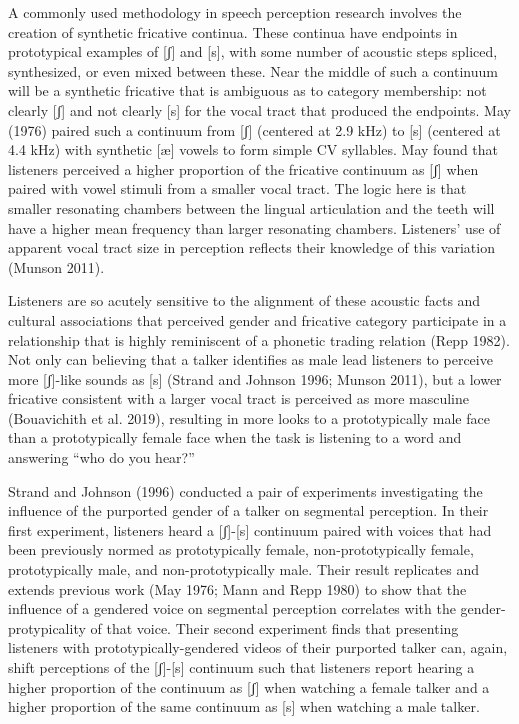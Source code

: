 \documentclass[
  letterpaper,
  DIV=11,
  numbers=noendperiod]{scrartcl}
\begin{document}
A commonly used methodology in speech perception research involves the
creation of synthetic fricative continua. These continua have endpoints
in prototypical examples of {[}ʃ{]} and {[}s{]}, with some number of
acoustic steps spliced, synthesized, or even mixed between these. Near
the middle of such a continuum will be a synthetic fricative that is
ambiguous as to category membership: not clearly {[}ʃ{]} and not clearly
{[}s{]} for the vocal tract that produced the endpoints. May (1976)
paired such a continuum from {[}ʃ{]} (centered at 2.9 kHz) to {[}s{]}
(centered at 4.4 kHz) with synthetic {[}æ{]} vowels to form simple CV
syllables. May found that listeners perceived a higher proportion of the
fricative continuum as {[}ʃ{]} when paired with vowel stimuli from a
smaller vocal tract. The logic here is that smaller resonating chambers
between the lingual articulation and the teeth will have a higher mean
frequency than larger resonating chambers. Listeners' use of apparent
vocal tract size in perception reflects their knowledge of this
variation (Munson 2011).

Listeners are so acutely sensitive to the alignment of these acoustic
facts and cultural associations that perceived gender and fricative
category participate in a relationship that is highly reminiscent of a
phonetic trading relation (Repp 1982). Not only can believing that a
talker identifies as male lead listeners to perceive more {[}ʃ{]}-like
sounds as {[}s{]} (Strand and Johnson 1996; Munson 2011), but a lower
fricative consistent with a larger vocal tract is perceived as more
masculine (Bouavichith et al. 2019), resulting in more looks to a
prototypically male face than a prototypically female face when the task
is listening to a word and answering ``who do you hear?''

Strand and Johnson (1996) conducted a pair of experiments investigating
the influence of the purported gender of a talker on segmental
perception. In their first experiment, listeners heard a {[}ʃ{]}-{[}s{]}
continuum paired with voices that had been previously normed as
prototypically female, non-prototypically female, prototypically male,
and non-prototypically male. Their result replicates and extends
previous work (May 1976; Mann and Repp 1980) to show that the influence
of a gendered voice on segmental perception correlates with the
gender-protypicality of that voice. Their second experiment finds that
presenting listeners with prototypically-gendered videos of their
purported talker can, again, shift perceptions of the {[}ʃ{]}-{[}s{]}
continuum such that listeners report hearing a higher proportion of the
continuum as {[}ʃ{]} when watching a female talker and a higher
proportion of the same continuum as {[}s{]} when watching a male talker.
\end{document}
